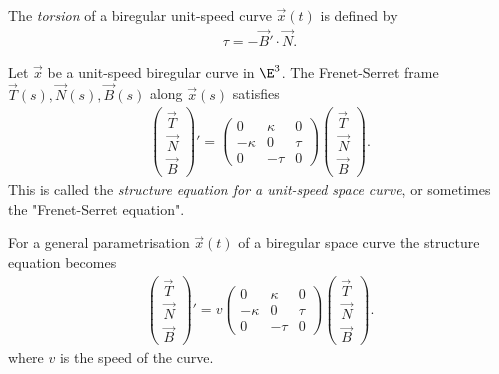 \documentclass{article}
\begin{document}
\begin{definition}
    The \emph{torsion} of a biregular unit-speed curve $\vec x(t)$ is defined by
    \begin{align*}
        \tau = - \vec B' \cdot \vec N.
    \end{align*}
\end{definition}

\begin{theorem}
    Let $\vec x$ be a unit-speed biregular curve in $\E^3$. The Frenet-Serret
    frame $\vec T(s), \vec N(s), \vec B(s)$ along $\vec x(s)$ satisfies
    \begin{align*}
        \begin{pmatrix}
            \vec T\\
            \vec N\\
            \vec B
        \end{pmatrix}'
        = \begin{pmatrix}
            0       & \kappa & 0 \\
            -\kappa & 0      & \tau \\
            0       & -\tau  & 0
        \end{pmatrix}
        \begin{pmatrix}
            \vec T\\
            \vec N\\
            \vec B
        \end{pmatrix}.
    \end{align*}
    This is called the \emph{structure equation for a unit-speed space curve},
    or sometimes the "Frenet-Serret equation".
\end{theorem}

\begin{theorem}
    For a general parametrisation $\vec x(t)$ of a biregular space curve the structure
    equation becomes 
    \begin{align*}
        \begin{pmatrix}
            \vec T\\
            \vec N\\
            \vec B
        \end{pmatrix}'
        = v\begin{pmatrix}
            0       & \kappa & 0 \\
            -\kappa & 0      & \tau \\
            0       & -\tau  & 0
        \end{pmatrix}
        \begin{pmatrix}
            \vec T\\
            \vec N\\
            \vec B
        \end{pmatrix}.
    \end{align*}
    where $v$ is the speed of the curve.
\end{theorem}
\end{document}
